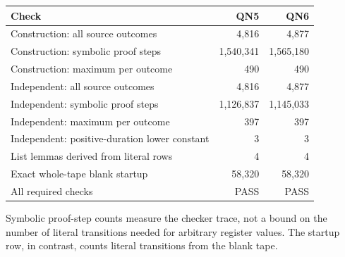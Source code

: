 \begin{center}
\begin{tabular}{@{}lrr@{}}
\toprule
Check & QN5 & QN6\\
\midrule
Construction: all source outcomes & 4,816 & 4,877\\
Construction: symbolic proof steps & 1,540,341 & 1,565,180\\
Construction: maximum per outcome & 490 & 490\\
Independent: all source outcomes & 4,816 & 4,877\\
Independent: symbolic proof steps & 1,126,837 & 1,145,033\\
Independent: maximum per outcome & 397 & 397\\
Independent: positive-duration lower constant & 3 & 3\\
List lemmas derived from literal rows & 4 & 4\\
Exact whole-tape blank startup & 58,320 & 58,320\\
\midrule
All required checks & PASS & PASS\\
\bottomrule
\end{tabular}
\end{center}
Symbolic proof-step counts measure the checker trace, not a bound on the
number of literal transitions needed for arbitrary register values.
The startup row, in contrast, counts literal transitions from the blank tape.
